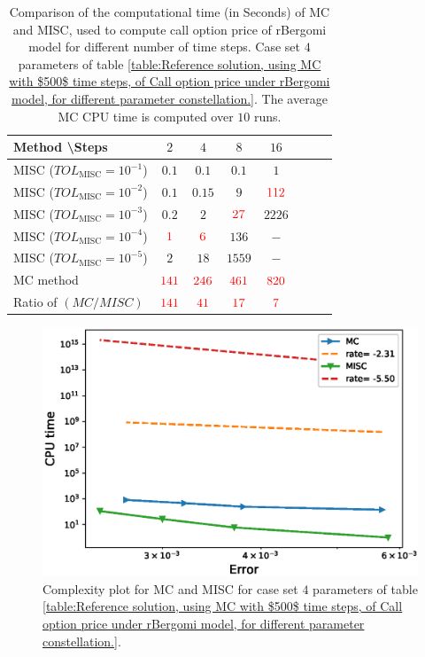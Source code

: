 \begin{table}[h!]
	\centering
	\begin{tabular}{l*{6}{c}r}
		Method \textbackslash  Steps            & $2$ & $4$ & $8$ & $16$ &   \\
		\hline
		MISC ($TOL_{\text{MISC}}=10^{-1}$)  & $0.1$ & $0.1$ & $0.1$ & $1$ \\
		MISC ($TOL_{\text{MISC}}=10^{-2}$)  & $0.1$ & $0.15$ & $9$ & $\red{112}$ \\
		MISC ($TOL_{\text{MISC}}=10^{-3}$)  & $0.2$ & $2$ & $\red{27}$ & $2226$ \\
		MISC ($TOL_{\text{MISC}}=10^{-4}$)  & $\red{1}$ & $\red{6}$ & $136$ & $-$\\
		MISC ($TOL_{\text{MISC}}=10^{-5}$)  & $2$ & $18$ & $1559$ & $-$
		\\
		\hline
		MC method   & $ \red{141}
		
		$  & $  \red{246}$  & $  \red{461}$ & $ \red{820}
		$  \\	
		\hline
		Ratio of $\left(MC/MISC \right)$ & $ \red{141}
		
		$  & $  \red{
			41
		}$  & $  \red{    17
		}$ & $ \red{ 7}
		$  \\	
%		
		\hline
	\end{tabular}
	\caption{Comparison of the computational time (in Seconds) of  MC and MISC, used to compute call option price of rBergomi model for different number of time steps. Case set $4$ parameters of table \ref{table:Reference solution, using MC with $500$ time steps, of Call option price under rBergomi model, for different parameter constellation.}. The average  MC CPU time is computed over $10$ runs. }
	\label{Comparsion of the computational time of  MC and MISC, used to compute Call option price of rBergomi model for different number of time steps. Case set4}
\end{table}




	\begin{figure}[h!]
	\centering
	\includegraphics[width=0.5\linewidth]{./figures/rBergomi_Complexity_rates/set6/error_vs_time_set6}
	
	\caption{Complexity plot for   MC and MISC for case set $4$ parameters of table \ref{table:Reference solution, using MC with $500$ time steps, of Call option price under rBergomi model, for different parameter constellation.}.}
	\label{fig:Complexity plot for MC and MISC for case set $4$ parameters}
\end{figure}
\FloatBarrier
